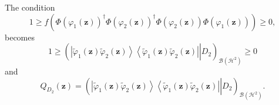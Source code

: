 \documentclass[aps,preprint]{revtex4}%
\begin{document}
The condition%
\begin{equation}
1\geq f\left(  \Phi\left(  \varphi_{1}\left(  \mathbf{z}\right)  \right)
^{\dagger}\Phi\left(  \varphi_{2}\left(  \mathbf{z}\right)  \right)
^{\dagger}\Phi\left(  \varphi_{2}\left(  \mathbf{z}\right)  \right)
\Phi\left(  \varphi_{1}\left(  \mathbf{z}\right)  \right)  \right)  \geq0,
\end{equation}
becomes
\begin{equation}
1\geq\left(  \left.  \overset{}{\left\vert \tilde{\varphi}_{1}\left(
\mathbf{z}\right)  \tilde{\varphi}_{2}\left(  \mathbf{z}\right)  \right\rangle
\left\langle \tilde{\varphi}_{1}\left(  \mathbf{z}\right)  \tilde{\varphi}%
_{2}\left(  \mathbf{z}\right)  \right\vert }\right\vert D_{2}\right)
_{\mathcal{B}\left(  \mathcal{H}^{2}\right)  }\geq0
\end{equation}
and
\begin{equation}
Q_{D_{2}}\left(  \mathbf{z}\right)  =\left(  \left.  \overset{}{\left\vert
\tilde{\varphi}_{1}\left(  \mathbf{z}\right)  \tilde{\varphi}_{2}\left(
\mathbf{z}\right)  \right\rangle \left\langle \tilde{\varphi}_{1}\left(
\mathbf{z}\right)  \tilde{\varphi}_{2}\left(  \mathbf{z}\right)  \right\vert
}\right\vert D_{2}\right)  _{\mathcal{B}\left(  \mathcal{H}^{2}\right)  }.
\end{equation}


\bigskip%
\end{document}
